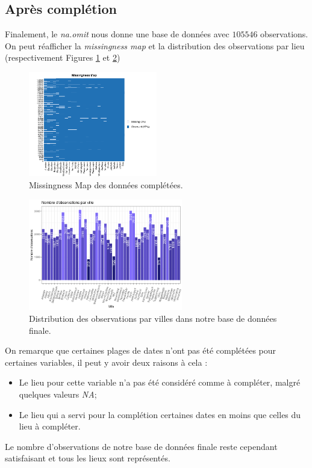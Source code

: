 \documentclass{article}
\begin{document}
\subsection{Après complétion}

Finalement, le \emph{na.omit} nous donne une base de données avec $105546$ observations. On peut réafficher la \emph{missingness map} et la distribution des observations par lieu (respectivement Figures \ref{fig:missingness_completed} et \ref{fig:distrib_completed})

\begin{figure}[htp]
    \centering
    \includegraphics[width=0.5\textwidth]{Images/missmap_completed.png}
    \caption{Missingness Map des données complétées.}
    \label{fig:missingness_completed}
\end{figure}

\begin{figure}[htp]
    \centering
    \includegraphics[width=0.6\textwidth]{Images/distribution_lieux_completed.png}
    \caption{Distribution des observations par villes dans notre base de données finale.}
    \label{fig:distrib_completed}
\end{figure}

On remarque que certaines plages de dates n'ont pas été complétées pour certaines variables, il peut y avoir deux raisons à cela : 
\begin{itemize}
    \item Le lieu pour cette variable n'a pas été considéré comme à compléter, malgré quelques valeurs \emph{NA};
    \item Le lieu qui a servi pour la complétion certaines dates en moins que celles du lieu à compléter.
\end{itemize}
Le nombre d'observations de notre base de données finale reste cependant satisfaisant et tous les lieux sont représentés.
\end{document}
